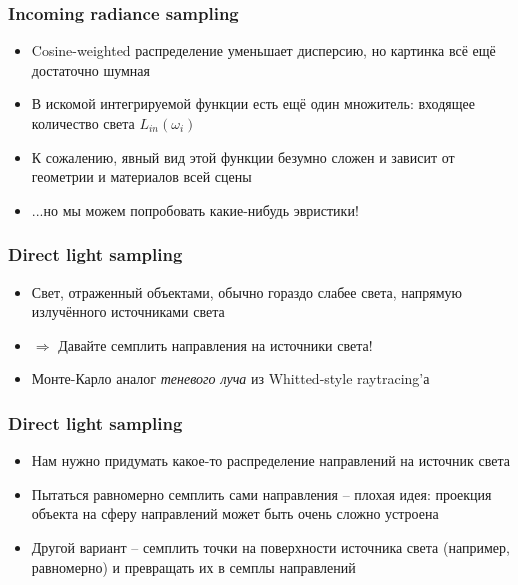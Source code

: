 \documentclass[10pt]{beamer}
\begin{document}
\begin{frame}
\frametitle{Incoming radiance sampling}
\begin{itemize}
\item Cosine-weighted распределение уменьшает дисперсию, но картинка всё ещё достаточно шумная
\pause
\item В искомой интегрируемой функции есть ещё один множитель: входящее количество света \begin{math}L_{in}(\omega_i)\end{math}
\pause
\item К сожалению, явный вид этой функции безумно сложен и зависит от геометрии и материалов всей сцены
\pause
\item ...но мы можем попробовать какие-нибудь эвристики!
\end{itemize}
\end{frame}

\begin{frame}
\frametitle{Direct light sampling}
\begin{itemize}
\item Свет, отраженный объектами, обычно гораздо слабее света, напрямую излучённого источниками света
\pause
\item \begin{math}\Longrightarrow\end{math} Давайте семплить направления на источники света!
\pause
\item Монте-Карло аналог \textit{теневого луча} из Whitted-style raytracing'а
\end{itemize}
\end{frame}

\begin{frame}
\frametitle{Direct light sampling}
\begin{itemize}
\item Нам нужно придумать какое-то распределение направлений на источник света
\pause
\item Пытаться равномерно семплить сами направления -- плохая идея: проекция объекта на сферу направлений может быть очень сложно устроена
\pause
\item Другой вариант -- семплить точки на поверхности источника света (например, равномерно) и превращать их в семплы направлений
\end{itemize}
\end{frame}
\end{document}

